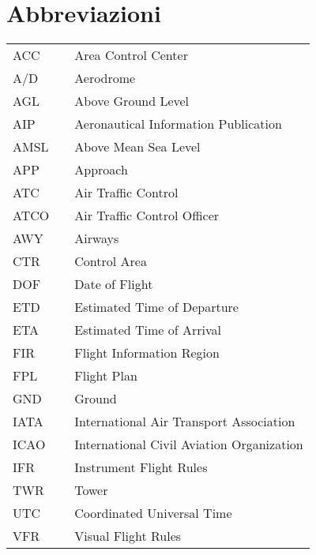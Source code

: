 \cleardoublepage %
\chapter*{Abbreviazioni} %


\begin{tabular}{lll}
    ACC & \hspace{3cm} & Area Control Center \\
    A/D & \hspace{3cm} & Aerodrome \\
    AGL & \hspace{3cm} & Above Ground Level \\
    AIP & \hspace{3cm} & Aeronautical Information Publication \\
    AMSL & \hspace{3cm} & Above Mean Sea Level \\
    APP & \hspace{3cm} & Approach \\
    ATC & \hspace{3cm} & Air Traffic Control \\
    ATCO & \hspace{3cm} & Air Traffic Control Officer \\
    AWY & \hspace{3cm} & Airways \\
    CTR & \hspace{3cm} & Control Area \\
    DOF & \hspace{3cm} & Date of Flight \\
    ETD & \hspace{3cm} & Estimated Time of Departure \\
    ETA & \hspace{3cm} & Estimated Time of Arrival \\
    FIR & \hspace{3cm} & Flight Information Region \\
    FPL & \hspace{3cm} & Flight Plan \\
    GND & \hspace{3cm} & Ground \\
    IATA & \hspace{3cm} & International Air Transport Association \\
    ICAO & \hspace{3cm} & International Civil Aviation Organization \\
    IFR & \hspace{3cm} & Instrument Flight Rules \\
    TWR & \hspace{3cm} & Tower \\
    UTC & \hspace{3cm} & Coordinated Universal Time \\
    VFR & \hspace{3cm} & Visual Flight Rules \\
    \end{tabular}